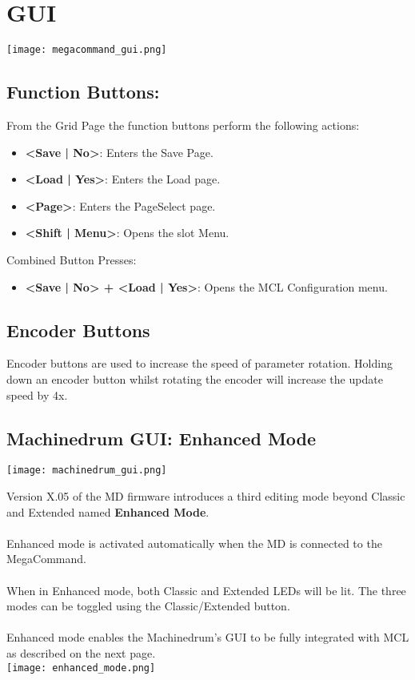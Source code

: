 \chapter{GUI}
\begin{center}
   \texttt{[image: megacommand\_gui.png]}
\end{center}
\section{Function Buttons:}
From the Grid Page the function buttons perform the following actions:
\begin{itemize}
\item{\textbf{<Save | No>}: Enters the Save Page.}
\item{\textbf{<Load | Yes>}: Enters the Load page.}
\item{\textbf{<Page>}: Enters the PageSelect page.}
\item{\textbf{<Shift | Menu>}: Opens the slot Menu. }
\end{itemize}
Combined Button Presses:
\begin{itemize}
\item{\textbf{<Save | No> + <Load | Yes>}: Opens the MCL Configuration menu. }
\end{itemize}

\section{Encoder Buttons}
Encoder buttons are used to increase the speed of parameter rotation.
Holding down an encoder button whilst rotating the encoder will increase the update speed by 4x.

\newpage
\section{Machinedrum GUI: Enhanced Mode}
\texttt{[image: machinedrum\_gui.png]}

Version X.05 of the MD firmware introduces a third editing mode beyond Classic and Extended named \textbf{Enhanced Mode}.\\
\\
Enhanced mode is activated automatically when the MD is connected to the MegaCommand.\\
\\
When in Enhanced mode, both Classic and Extended LEDs will be lit. The three modes can be toggled using the Classic/Extended button.\\
\\
Enhanced mode enables the Machinedrum's GUI to be fully integrated with MCL as described on the next page.
\\
\texttt{[image: enhanced\_mode.png]}
\newpage
